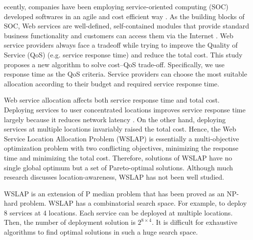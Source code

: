 \documentclass[10pt,journal,compsoc]{IEEEtran}
\begin{document}
\maketitle
\IEEEdisplaynontitleabstractindextext
\IEEEpeerreviewmaketitle

\vspace{-20 mm}


ecently, companies have been employing service-oriented computing (SOC) developed softwares in an agile and cost efficient way \cite{Dan:2008}. 
As the building blocks of SOC, Web services are well-defined, self-contained modules that provide standard business functionality and customers can access them via the Internet \cite{Ran}. 
Web service providers always face a tradeoff while trying to improve the Quality of Service (QoS) \cite{Menasce:2002:QIW:613357.613758} (e.g. service response time) and reduce the total cost.
This study proposes a new algorithm to solve cost--QoS trade-off. Specifically, we use response time as the QoS criteria. Service providers can choose the most suitable allocation according to their budget and required service response time.

Web service allocation affects both service response time and total cost. Deploying services to user concentrated locations improves service response time largely because it reduces network latency \cite{916684}. On the other hand, deploying services at multiple locations invariably raised the total cost. Hence, the Web Service Location Allocation Problem (WSLAP) is
essentially a multi-objective optimization problem \cite{Multiobjective} with two conflicting objectives, minimizing the response time and minimizing the total cost. Therefore, 
solutions of WSLAP have no single global optimum but a set of Pareto-optimal solutions. Although much research \cite{7108071} discusses location-awareness, WSLAP has not been well studied.

WSLAP is an extension of P median problem \cite{mladenovic2007p} that has been proved as an NP-hard problem.
WSLAP has a combinatorial search space. For example, to deploy 8 services at 4 locations. Each service can be deployed at multiple locations. Then, the number of deployment solution is $2^{8 \times 4}$. It is difficult for exhaustive algorithms to find optimal solutions in such a huge search space.  
\end{document}
